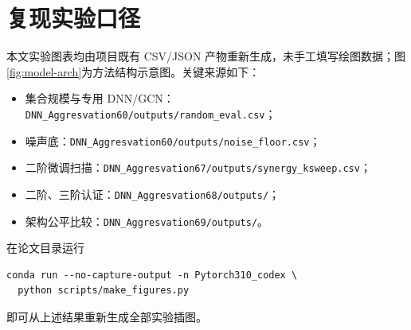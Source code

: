 \documentclass[UTF8,a4paper,zihao=5,fontset=fandol]{ctexart}
\begin{document}


\appendix
\section{复现实验口径}

本文实验图表均由项目既有 CSV/JSON 产物重新生成，未手工填写绘图数据；图\ref{fig:model-arch}为方法结构示意图。关键来源如下：
\begin{itemize}
  \item 集合规模与专用 DNN/GCN：\texttt{DNN\_Aggresvation60/outputs/random\_eval.csv}；
  \item 噪声底：\texttt{DNN\_Aggresvation60/outputs/noise\_floor.csv}；
  \item 二阶微调扫描：\texttt{DNN\_Aggresvation67/outputs/synergy\_ksweep.csv}；
  \item 二阶、三阶认证：\texttt{DNN\_Aggresvation68/outputs/}；
  \item 架构公平比较：\texttt{DNN\_Aggresvation69/outputs/}。
\end{itemize}
在论文目录运行
\begin{verbatim}
conda run --no-capture-output -n Pytorch310_codex \
  python scripts/make_figures.py
\end{verbatim}
即可从上述结果重新生成全部实验插图。
\end{document}
